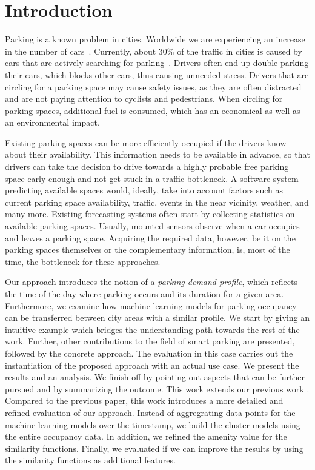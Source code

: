 \section{Introduction}
Parking is a known problem in cities.
Worldwide we are experiencing an increase in the number of cars~\cite{car_increase}.
Currently, about 30\% of the traffic in cities is caused by cars that are actively searching for parking~\cite{traffic_congestion}.
Drivers often end up double-parking their cars, which blocks other cars, thus causing unneeded stress.
Drivers that are circling for a parking space may cause safety issues, as they are often distracted and are not paying attention to cyclists and pedestrians.
When circling for parking spaces, additional fuel is consumed, which has an economical as well as an environmental impact.

Existing parking spaces can be more efficiently occupied if the drivers know about their availability.
This information needs to be available in advance, so that drivers can take the decision to drive towards a highly probable free parking space early enough and not get stuck in a traffic bottleneck.
A software system predicting available spaces would, ideally, take into account factors such as current parking space availability, traffic, events in the near vicinity, weather, and many more.
Existing forecasting systems often start by collecting statistics on available parking spaces.
Usually, mounted sensors observe when a car occupies and leaves a parking space.
Acquiring the required data, however, be it on the parking spaces themselves or the complementary information, is, most of the time, the bottleneck for these approaches. 

Our approach introduces the notion of a \textit{parking demand profile}, which reflects the time of the day where parking occurs and its duration for a given area.
Furthermore, we examine how machine learning models for parking occupancy can be transferred between city areas with a similar profile.
We start by giving an intuitive example which bridges the understanding path towards the rest of the work.
Further, other contributions to the field of smart parking are presented, followed by the concrete approach.
The evaluation in this case carries out the instantiation of the proposed approach with an actual use case. We present the results and an analysis.
We finish off by pointing out aspects that can be further pursued and by summarizing the outcome.
This work extends our previous work \cite{ionita2018park}. Compared to the previous paper, this work introduces a more detailed and refined evaluation of our approach.
Instead of aggregrating data points for the machine learning models over the timestamp, we build the cluster models using the entire occupancy data. 
In addition, we refined the amenity value for the similarity functions. Finally, we evaluated if we can improve the results by using the similarity functions as additional features. 

